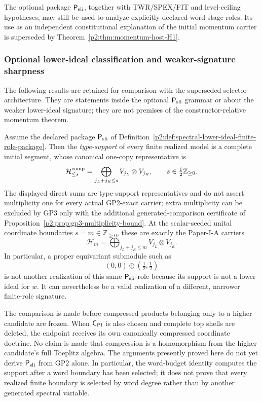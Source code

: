 \documentclass[11pt,a4paper]{article}
\begin{document}
The optional package \(\mathsf P_{\rm sli}\), together with TWR/SPEX/FIT and
level-ceiling hypotheses, may still be used to analyze explicitly declared
word-stage roles.  Its use as an independent constitutional explanation of the
initial momentum carrier is superseded by
Theorem~\ref{p2:thm:momentum-host-H1}.

\subsubsection{Optional lower-ideal classification and weaker-signature sharpness}
\label{p2b:app:legacy-lower-ideal}
The following results are retained for comparison with the superseded
selector architecture.  They are statements inside the optional
\(\mathsf P_{\rm sli}\) grammar or about the weaker lower-ideal signature; they are
not premises of the constructor-relative momentum theorem.

\begin{theorem}
\label{p2:thm:gp2-exact-label-complete-level-class}
Assume the declared package \(\mathsf P_{\rm sli}\) of
Definition~\ref{p2:def:spectral-lower-ideal-finite-role-package}.  Then the \emph{type-support} of every finite realized model is a
complete initial segment, whose canonical one-copy representative is
\[
 \mathcal H_{\le s}^{\rm comp}
 =
 \bigoplus_{j_L+j_R\le s}V_{j_L}\otimes V_{j_R},
 \qquad
 s\in\tfrac12\mathbb Z_{\ge0}.
\]
The displayed direct sums are type-support representatives and do not assert
multiplicity one for every actual GP2-exact carrier; extra multiplicity can
be excluded by GP3 only with the additional generated-comparison certificate
of Proposition~\ref{p2:prop:gp3-multiplicity-bound}.
At the scalar-seeded unital coordinate boundaries \(s=m\in\mathbb
Z_{\ge0}\), these are exactly the Paper-I-A carriers
\[
        \mathcal H_m
        =\bigoplus_{j_L+j_R\le m}V_{j_L}\otimes V_{j_R}.
\]
In particular, a proper equivariant submodule such as
\[
        (0,0)\oplus(\tfrac12,\tfrac12)
\]
is not another realization of this same \(\mathsf P_{\rm sli}\)-role because
its support is not a lower ideal for \(w\).  It can nevertheless be a valid
realization of a different, narrower finite-role signature.

The comparison is made before compressed products belonging only to a
higher candidate are frozen.  When \(\mathsf C_{\rm PI}\) is also chosen
and complete top shells are deleted, the endpoint receives its own
canonically compressed coordinate doctrine.  No claim is made that
compression is a homomorphism from the higher candidate's full Toeplitz
algebra.  The arguments presently proved here do not yet derive
\(\mathsf P_{\rm sli}\) from GP2 alone.  In particular, the word-budget
identity computes the support after a word boundary has been selected; it
does not prove that every realized finite boundary is selected by word degree
rather than by another generated spectral variable.
\end{theorem}
\end{document}
